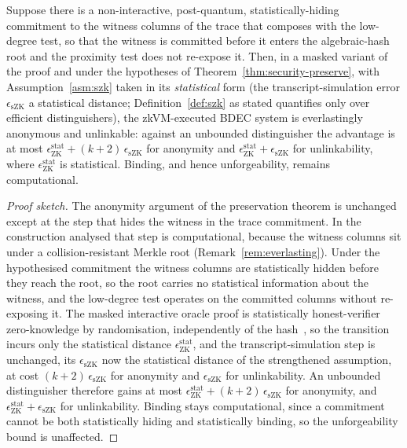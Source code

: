 \begin{proposition}\label{prop:everlasting}
    Suppose there is a non-interactive, post-quantum, statistically-hiding commitment to the witness columns of the trace that composes with the low-degree test, so that the witness is committed before it enters the algebraic-hash root and the proximity test does not re-expose it. Then, in a masked variant of the proof and under the hypotheses of Theorem~\ref{thm:security-preserve}, with Assumption~\ref{asm:szk} taken in its \emph{statistical} form (the transcript-simulation error $\epsilon_{\mathrm{sZK}}$ a statistical distance; Definition~\ref{def:szk} as stated quantifies only over efficient distinguishers), the zkVM-executed BDEC system is everlastingly anonymous and unlinkable: against an unbounded distinguisher the advantage is at most $\epsilon_{\mathrm{ZK}}^{\mathrm{stat}} + (k+2)\,\epsilon_{\mathrm{sZK}}$ for anonymity and $\epsilon_{\mathrm{ZK}}^{\mathrm{stat}} + \epsilon_{\mathrm{sZK}}$ for unlinkability, where $\epsilon_{\mathrm{ZK}}^{\mathrm{stat}}$ is statistical. Binding, and hence unforgeability, remains computational.
\end{proposition}

\begin{proof}[Proof sketch]
    The anonymity argument of the preservation theorem is unchanged except at the step that hides the witness in the trace commitment. In the construction analysed that step is computational, because the witness columns sit under a collision-resistant Merkle root (Remark~\ref{rem:everlasting}). Under the hypothesised commitment the witness columns are statistically hidden before they reach the root, so the root carries no statistical information about the witness, and the low-degree test operates on the committed columns without re-exposing it. The masked interactive oracle proof is statistically honest-verifier zero-knowledge by randomisation, independently of the hash~\cite{cryptoeprint:2024/1037}, so the transition incurs only the statistical distance $\epsilon_{\mathrm{ZK}}^{\mathrm{stat}}$, and the transcript-simulation step is unchanged, its $\epsilon_{\mathrm{sZK}}$ now the statistical distance of the strengthened assumption, at cost $(k+2)\,\epsilon_{\mathrm{sZK}}$ for anonymity and $\epsilon_{\mathrm{sZK}}$ for unlinkability. An unbounded distinguisher therefore gains at most $\epsilon_{\mathrm{ZK}}^{\mathrm{stat}} + (k+2)\,\epsilon_{\mathrm{sZK}}$ for anonymity, and $\epsilon_{\mathrm{ZK}}^{\mathrm{stat}} + \epsilon_{\mathrm{sZK}}$ for unlinkability. Binding stays computational, since a commitment cannot be both statistically hiding and statistically binding, so the unforgeability bound is unaffected.
\end{proof}

